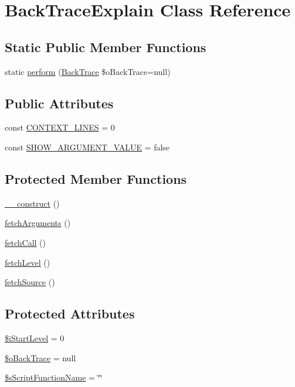 \hypertarget{class_back_trace_explain}{
\section{BackTraceExplain Class Reference}
\label{class_back_trace_explain}
}
\subsection*{Static Public Member Functions}
\begin{CompactItemize}
\item 
static \hyperlink{class_back_trace_explain_7c43123f132faff85e225130dcdff9ec}{perform} (\hyperlink{class_back_trace}{BackTrace} \$oBackTrace=null)
\end{CompactItemize}
\subsection*{Public Attributes}
\begin{CompactItemize}
\item 
const \hyperlink{class_back_trace_explain_a43a9dad0003990817f208568687ef4b}{CONTEXT\_\-LINES} = 0
\item 
const \hyperlink{class_back_trace_explain_c588570f668add1f67e691c222c227b8}{SHOW\_\-ARGUMENT\_\-VALUE} = false
\end{CompactItemize}
\subsection*{Protected Member Functions}
\begin{CompactItemize}
\item 
\hyperlink{class_back_trace_explain_bff895e7ada850dfc6a085768d3eaf7c}{\_\-\_\-construct} ()
\item 
\hyperlink{class_back_trace_explain_de9dbd3de5542aebcbf59e965d963b8a}{fetchArguments} ()
\item 
\hyperlink{class_back_trace_explain_485a5d60f6cdb95bb96f58299142e2a4}{fetchCall} ()
\item 
\hyperlink{class_back_trace_explain_eca7af75c0df67f42d8f8fbbc910c1f5}{fetchLevel} ()
\item 
\hyperlink{class_back_trace_explain_bcec7ab0fe0e54f33cdd7b5e3df5bc8c}{fetchSource} ()
\end{CompactItemize}
\subsection*{Protected Attributes}
\begin{CompactItemize}
\item 
\hyperlink{class_back_trace_explain_ec3a3d33c1d97e5e13a39d4002dd080b}{\$iStartLevel} = 0
\item 
\hyperlink{class_back_trace_explain_9ff2e8e9084fb38b8a436619a417e5d8}{\$oBackTrace} = null
\item 
\hyperlink{class_back_trace_explain_bf9c6e181f88cd54aeb6551a98fb6b7b}{\$sScriptFunctionName} = \char`\"{}\char`\"{}
\end{CompactItemize}
